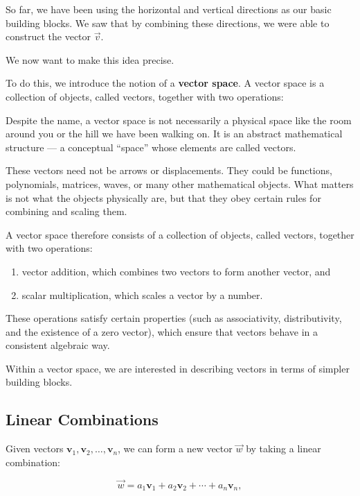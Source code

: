 \documentclass[11pt,openany]{book}
\theoremstyle{definition}
\begin{document}
So far, we have been using the horizontal and vertical directions as our basic building blocks.
We saw that by combining these directions, we were able to construct the vector $\vec{v}$.

We now want to make this idea precise.

To do this, we introduce the notion of a \textbf{vector space}.
A vector space is a collection of objects, called vectors, together with two operations:

\medskip

Despite the name, a vector space is not necessarily a physical space like the room
around you or the hill we have been walking on. It is an abstract mathematical structure
--- a conceptual ``space'' whose elements are called vectors.

\medskip

These vectors need not be arrows or displacements. They could be functions, polynomials,
matrices, waves, or many other mathematical objects. What matters is not what the objects
physically are, but that they obey certain rules for combining and scaling them.

\medskip

A vector space therefore consists of a collection of objects, called vectors, together
with two operations:

\begin{enumerate}
  \item vector addition, which combines two vectors to form another vector, and
  \item scalar multiplication, which scales a vector by a number.
\end{enumerate}

These operations satisfy certain properties (such as associativity, distributivity, and the existence of a zero vector),
which ensure that vectors behave in a consistent algebraic way.

\medskip

Within a vector space, we are interested in describing vectors in terms of simpler building blocks.

\subsection{Linear Combinations}

Given vectors $\mathbf{v}_1, \mathbf{v}_2, \dots, \mathbf{v}_n$,
we can form a new vector $\vec{w}$ by taking a linear combination:

\[
\vec{w} = a_1 \mathbf{v}_1 + a_2 \mathbf{v}_2 + \cdots + a_n \mathbf{v}_n,
\]
\end{document}

